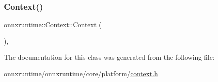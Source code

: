 \subsubsection{\texorpdfstring{Context()}{Context()}\hspace{0.1cm}{\footnotesize\ttfamily [2/2]}}
{\footnotesize\ttfamily onnxruntime\+::\+Context\+::\+Context (\begin{DoxyParamCaption}\item[{const \mbox{\hyperlink{namespaceonnxruntime_ac95cfa5c0a456b3e7c88aa53eb073ee8}{Context\+Kind}}}]{ }\end{DoxyParamCaption})\hspace{0.3cm}{\ttfamily [inline]}, {\ttfamily [noexcept]}}



The documentation for this class was generated from the following file\+:\begin{DoxyCompactItemize}
\item 
onnxruntime/onnxruntime/core/platform/\mbox{\hyperlink{context_8h}{context.\+h}}\end{DoxyCompactItemize}
